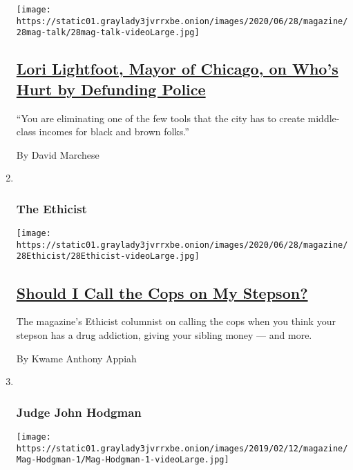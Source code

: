 \begin{enumerate}
  \texttt{[image: https://static01.graylady3jvrrxbe.onion/images/2020/06/28/magazine/28mag-talk/28mag-talk-videoLarge.jpg]}

  \hypertarget{lori-lightfoot-mayor-of-chicago-on-whos-hurt-by-defunding-police}{%
  \subsection{\texorpdfstring{\href{/interactive/2020/06/22/magazine/lori-lightfoot-chicago-police.html}{Lori
  Lightfoot, Mayor of Chicago, on Who's Hurt by Defunding
  Police}}{Lori Lightfoot, Mayor of Chicago, on Who's Hurt by Defunding Police}}\label{lori-lightfoot-mayor-of-chicago-on-whos-hurt-by-defunding-police}}

  ``You are eliminating one of the few tools that the city has to create
  middle-class incomes for black and brown folks.''

  By David Marchese
\item ~
  \hypertarget{the-ethicist}{%
  \subsubsection{The Ethicist}\label{the-ethicist}}

  \texttt{[image: https://static01.graylady3jvrrxbe.onion/images/2020/06/28/magazine/28Ethicist/28Ethicist-videoLarge.jpg]}

  \hypertarget{should-i-call-the-cops-on-my-stepson}{%
  \subsection{\texorpdfstring{\href{/2020/06/23/magazine/should-i-call-the-cops-on-my-stepson.html}{Should
  I Call the Cops on My
  Stepson?}}{Should I Call the Cops on My Stepson?}}\label{should-i-call-the-cops-on-my-stepson}}

  The magazine's Ethicist columnist on calling the cops when you think
  your stepson has a drug addiction, giving your sibling money --- and
  more.

  By Kwame Anthony Appiah
\item ~
  \hypertarget{judge-john-hodgman}{%
  \subsubsection{Judge John Hodgman}\label{judge-john-hodgman}}

  \texttt{[image: https://static01.graylady3jvrrxbe.onion/images/2019/02/12/magazine/Mag-Hodgman-1/Mag-Hodgman-1-videoLarge.jpg]}


\end{enumerate}
